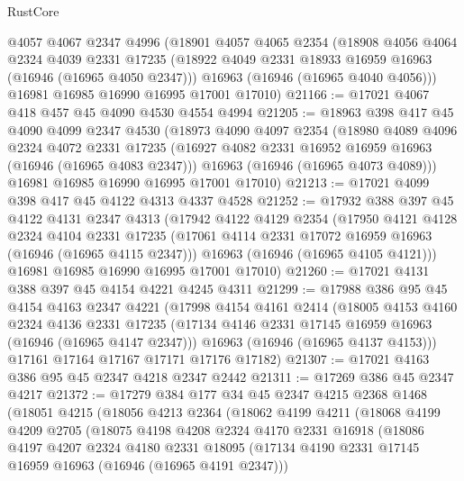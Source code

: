 \begin{lexlean}{RustCore}
\begin{coremodule}
    @4057
    @4067
    @2347
    @4996
    (@18901
      @4057
      @4065
      @2354
      (@18908
        @4056
        @4064
        @2324
        @4039
        @2331
        @17235
        (@18922 @4049 @2331 @18933 @16959 @16963 (@16946 (@16965 @4050 @2347)))
        @16963
        (@16946 (@16965 @4040 @4056)))
      @16981
      @16985
      @16990
      @16995
      @17001
      @17010)
@21166 := @17021 @4067 @418 @457 @45 @4090 @4530 @4554 @4994
@21205 := @18963
    @398
    @417
    @45
    @4090
    @4099
    @2347
    @4530
    (@18973
      @4090
      @4097
      @2354
      (@18980
        @4089
        @4096
        @2324
        @4072
        @2331
        @17235
        (@16927 @4082 @2331 @16952 @16959 @16963 (@16946 (@16965 @4083 @2347)))
        @16963
        (@16946 (@16965 @4073 @4089)))
      @16981
      @16985
      @16990
      @16995
      @17001
      @17010)
@21213 := @17021 @4099 @398 @417 @45 @4122 @4313 @4337 @4528
@21252 := @17932
    @388
    @397
    @45
    @4122
    @4131
    @2347
    @4313
    (@17942
      @4122
      @4129
      @2354
      (@17950
        @4121
        @4128
        @2324
        @4104
        @2331
        @17235
        (@17061 @4114 @2331 @17072 @16959 @16963 (@16946 (@16965 @4115 @2347)))
        @16963
        (@16946 (@16965 @4105 @4121)))
      @16981
      @16985
      @16990
      @16995
      @17001
      @17010)
@21260 := @17021 @4131 @388 @397 @45 @4154 @4221 @4245 @4311
@21299 := @17988
    @386
    @95
    @45
    @4154
    @4163
    @2347
    @4221
    (@17998
      @4154
      @4161
      @2414
      (@18005
        @4153
        @4160
        @2324
        @4136
        @2331
        @17235
        (@17134 @4146 @2331 @17145 @16959 @16963 (@16946 (@16965 @4147 @2347)))
        @16963
        (@16946 (@16965 @4137 @4153)))
      @17161
      @17164
      @17167
      @17171
      @17176
      @17182)
@21307 := @17021 @4163 @386 @95 @45 @2347 @4218 @2347 @2442
@21311 := @17269 @386 @45 @2347 @4217
@21372 := @17279
    @384
    @177
    @34
    @45
    @2347
    @4215
    @2368
    @1468
    (@18051
      @4215
      (@18056
        @4213
        @2364
        (@18062
          @4199
          @4211
          (@18068
            @4199
            @4209
            @2705
            (@18075
              @4198
              @4208
              @2324
              @4170
              @2331
              @16918
              (@18086
                @4197
                @4207
                @2324
                @4180
                @2331
                @18095
                (@17134 @4190 @2331 @17145 @16959 @16963 (@16946 (@16965 @4191 @2347)))

\end{coremodule}
\end{lexlean}
